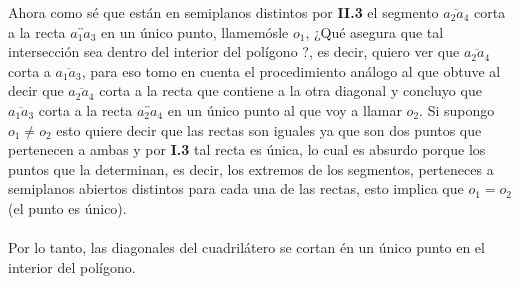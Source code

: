\documentclass[a4paper]{article}
\begin{document}
Ahora como sé que están en semiplanos distintos por \textbf{II.3} el segmento $\overline{a_2a_4}$ corta a la recta $\overleftrightarrow{a_1a_3}$ en un único punto, llamemósle $o_1$, ¿Qué asegura que tal intersección sea dentro del interior del polígono ?, es decir, quiero ver que $\overline{a_2a_4}$ corta a $\overline{a_1a_3}$, para eso tomo en cuenta el procedimiento análogo al que obtuve al decir que $\overline{a_2a_4}$ corta a la recta que contiene a la otra diagonal y concluyo que $\overline{a_1a_3}$ corta a la recta $\overleftrightarrow{a_2a_4}$ en un único punto al que voy a llamar $o_2$. Si supongo $o_1 \neq o_2$ esto quiere decir que las rectas son iguales ya que son dos puntos que pertenecen a ambas y por \textbf{I.3} tal recta es única, lo cual es absurdo porque los puntos que la determinan, es decir, los extremos de los segmentos, perteneces a semiplanos abiertos distintos para cada una de las rectas, esto implica que $o_1=o_2$ (el punto es único).\\\\
Por lo tanto, las diagonales del cuadrilátero se cortan én un único punto en el interior del polígono.
\end{document}

